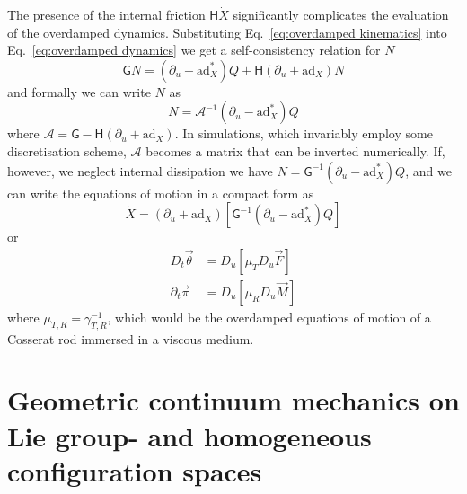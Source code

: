 The presence of the internal friction $\mathsf{H} \dot{X}$ significantly complicates the evaluation of the overdamped dynamics. Substituting Eq.~\ref{eq:overdamped kinematics} into Eq.~\ref{eq:overdamped dynamics} we get a self-consistency relation for $N$
\begin{equation}
\mathsf{G} N = \left( \partial_u - \text{ad}_X^* \right) Q + \mathsf{H} (\partial_u + \text{ad}_X ) N
\end{equation}
and formally we can write $N$ as
\begin{equation}
N = \mathscr{A}^{-1} \left( \partial_u - \text{ad}_X^* \right) Q
\end{equation}
where $\mathscr{A} = \mathsf{G} - \mathsf{H} (\partial_u + \text{ad}_X)$. In simulations, which invariably employ some discretisation scheme, $\mathscr{A}$ becomes a matrix that can be inverted numerically. If, however, we neglect internal dissipation we have $N = \mathsf{G}^{-1} \left( \partial_u - \text{ad}_X^* \right) Q$, and we can write the equations of motion in a compact form as
\begin{equation}
\dot{X}  = (\partial_u + \text{ad}_X ) \left[ \mathsf{G}^{-1} \left( \partial_u - \text{ad}_X^* \right) Q \right]
\end{equation}
or
\begin{subequations} 
\begin{align}
D_t \vec{\theta} & = D_u \left[ \mu_T D_u \vec{F} \right] \\
\partial_t \vec{\pi} & = D_u \left[ \mu_R  D_u \vec{M} \right] 
\end{align}
\end{subequations}
where $\mu_{T,R} = \gamma_{T,R}^{-1}$, which would be the overdamped equations of motion of a Cosserat rod immersed in a viscous medium. 


 



\chapter{Geometric continuum mechanics on Lie group- and homogeneous configuration spaces} \label{ch:Geometric continuum mechanics on homogeneous configuration spaces}

